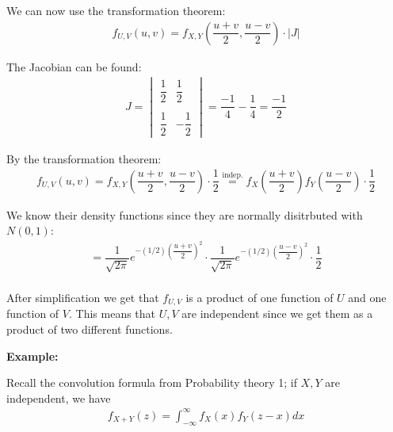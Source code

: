 \noindent We can now use the transformation theorem:
\begin{equation*}
  \begin{gathered}
    f_{U,V}(u,v)=f_{X,Y}\left(\dfrac{u+v}{2}, \dfrac{u-v}{2}\right)\cdot\left|J\right|
  \end{gathered}
\end{equation*}\par
\noindent The Jacobian can be found:
\begin{equation*}
  \begin{gathered}
    J = \begin{vmatrix}\dfrac{1}{2}&\dfrac{1}{2}\\\\\dfrac{1}{2}&-\dfrac{1}{2}\end{vmatrix} = \dfrac{-1}{4}-\dfrac{1}{4} = \dfrac{-1}{2}
  \end{gathered}
\end{equation*}
\par\bigskip
\noindent By the transformation theorem:
\begin{equation*}
  \begin{gathered}
    f_{U,V}(u,v) = f_{X,Y}\left(\dfrac{u+v}{2}, \dfrac{u-v}{2}\right)\cdot\dfrac{1}{2}\stackrel{\text{indep.}}{=}f_X\left(\dfrac{u+v}{2}\right)f_Y\left(\dfrac{u-v}{2}\right)\cdot\dfrac{1}{2}
  \end{gathered}
\end{equation*}\par
\noindent We know their density functions since they are normally disitrbuted with $N(0,1)$:
\begin{equation*}
  \begin{gathered}
    = \dfrac{1}{\sqrt{2\pi}}e^{-(1/2)\left(\dfrac{u+v}{2}\right)^2}\cdot\dfrac{1}{\sqrt{2\pi}}e^{-(1/2)\left(\dfrac{u-v}{2}\right)^2}\cdot\dfrac{1}{2}\\
  \end{gathered}
\end{equation*}\par
\noindent After simplification we get that $f_{U,V}$ is a product of one function of $U$ and one function of $V$. This means that $U,V$ are independent since we get them as a product of two different functions. 
\par\bigskip
\noindent\textbf{Example:}\par
\noindent Recall the convolution formula from Probability theory 1; if $X,Y$ are independent, we have
\begin{equation*}
  \begin{gathered}
    f_{X+Y}(z) = \int_{-\infty}^\infty f_X(x)f_Y(z-x)dx
  \end{gathered}
\end{equation*}
